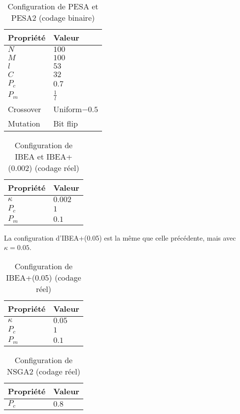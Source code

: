 \documentclass[12pt]{article}
\begin{document}
\begin{table}[ht]
  \centering
  \begin{tabular}{|l|l|}
    \hline
    \textbf{Propriété} & \textbf{Valeur}\\
    \hline
    $N$ & $100$  \\
    \hline
    $M$ & $100$  \\
    \hline
    $l$ & $53$  \\
    \hline
    $C$ & $32$  \\
    \hline
    $P_c$ & $0.7$  \\
    \hline
    $P_m$ & $\frac{1}{l}$  \\
    \hline
    Crossover & Uniform$-0.5$ \\
    \hline
    Mutation & Bit flip \\
    \hline
  \end{tabular}
  \caption{Configuration de PESA et PESA2 (codage binaire)} 
\end{table}

\begin{table}[ht]
  \centering
  \begin{tabular}{|l|l|}
    \hline
    \textbf{Propriété} & \textbf{Valeur}\\
    \hline
    $\kappa$ & $0.002$  \\
    \hline
    $P_c$ & $1$  \\
    \hline
    $P_m$ & $0.1$  \\
    \hline
  \end{tabular}
  \caption{Configuration de IBEA et IBEA+(0.002) (codage réel)} 
\end{table}
\FloatBarrier

La configuration d'IBEA+(0.05) est la même que celle
précédente, mais avec $\kappa = 0.05$.

\begin{table}[ht]
  \centering
  \begin{tabular}{|l|l|}
    \hline
    \textbf{Propriété} & \textbf{Valeur}\\
    \hline
    $\kappa$ & $0.05$  \\
    \hline
    $P_c$ & $1$  \\
    \hline
    $P_m$ & $0.1$  \\
    \hline
  \end{tabular}
  \caption{Configuration de IBEA+(0.05) (codage réel)} 
\end{table}

\begin{table}[ht]
  \centering
  \begin{tabular}{|l|l|}
    \hline
    \textbf{Propriété} & \textbf{Valeur}\\
    \hline
    $P_c$ & $0.8$  \\
    \hline
  \end{tabular}
  \caption{Configuration de NSGA2 (codage réel)} 
\end{table}
\end{document}
